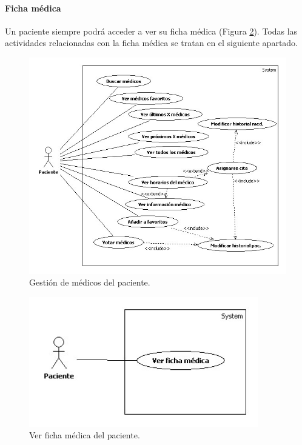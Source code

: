 \documentclass[a4paper,oneside,11pt]{book}
\begin{document}
			
			\paragraph{Ficha médica} %
			\label{par:ficha_medica}
				
				Un paciente siempre podrá acceder a ver su ficha médica (Figura \ref{fig:ficha_pac}). Todas las actividades relacionadas con la ficha médica se tratan en el siguiente apartado.
				\begin{figure}[H]
				  \centering
				    \includegraphics[width=14cm]{img/jpg/casos_uso/Gestion_medicos.jpg}
				  \caption{Gestión de médicos del paciente.}
				  \label{fig:med_pac}
				\end{figure}
				
				\begin{figure}[H]
				  \centering
				    \includegraphics[width=10cm]{img/jpg/casos_uso/Ver_ficha_medica.jpg}
				  \caption{Ver ficha médica del paciente.}
				  \label{fig:ficha_pac}
				\end{figure}
			
\end{document}

